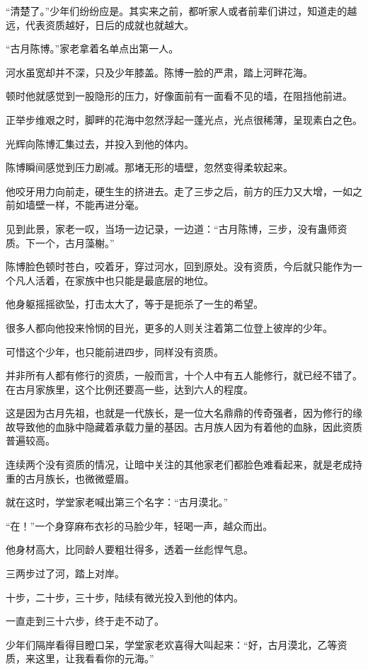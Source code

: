 \begin{this_body}
“清楚了。”少年们纷纷应是。其实来之前，都听家人或者前辈们讲过，知道走的越远，代表资质越好，日后的成就也就越大。

“古月陈博。”家老拿着名单点出第一人。

河水虽宽却并不深，只及少年膝盖。陈博一脸的严肃，踏上河畔花海。

顿时他就感觉到一股隐形的压力，好像面前有一面看不见的墙，在阻挡他前进。

正举步维艰之时，脚畔的花海中忽然浮起一蓬光点，光点很稀薄，呈现素白之色。

光辉向陈博汇集过去，并投入到他的体内。

陈博瞬间感觉到压力剧减。那堵无形的墙壁，忽然变得柔软起来。

他咬牙用力向前走，硬生生的挤进去。走了三步之后，前方的压力又大增，一如之前如墙壁一样，不能再进分毫。

见到此景，家老一叹，当场一边记录，一边道：“古月陈博，三步，没有蛊师资质。下一个，古月藻榭。”

陈博脸色顿时苍白，咬着牙，穿过河水，回到原处。没有资质，今后就只能作为一个凡人活着，在家族中也只能是最底层的地位。

他身躯摇摇欲坠，打击太大了，等于是扼杀了一生的希望。

很多人都向他投来怜悯的目光，更多的人则关注着第二位登上彼岸的少年。

可惜这个少年，也只能前进四步，同样没有资质。

并非所有人都有修行的资质，一般而言，十个人中有五人能修行，就已经不错了。在古月家族里，这个比例还要高一些，达到六人的程度。

这是因为古月先祖，也就是一代族长，是一位大名鼎鼎的传奇强者，因为修行的缘故导致他的血脉中隐藏着承载力量的基因。古月族人因为有着他的血脉，因此资质普遍较高。

连续两个没有资质的情况，让暗中关注的其他家老们都脸色难看起来，就是老成持重的古月族长，也微微蹙眉。

就在这时，学堂家老喊出第三个名字：“古月漠北。”

“在！”一个身穿麻布衣衫的马脸少年，轻喝一声，越众而出。

他身材高大，比同龄人要粗壮得多，透着一丝彪悍气息。

三两步过了河，踏上对岸。

十步，二十步，三十步，陆续有微光投入到他的体内。

一直走到三十六步，终于走不动了。

少年们隔岸看得目瞪口呆，学堂家老欢喜得大叫起来：“好，古月漠北，乙等资质，来这里，让我看看你的元海。”


\end{this_body}
